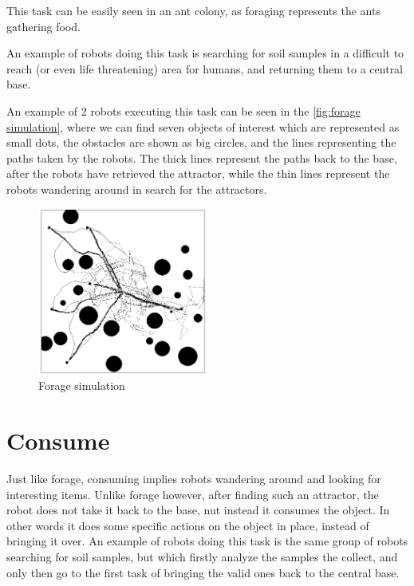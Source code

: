 \documentclass[12pt]{report}
\begin{document}
This task can be easily seen in an ant colony, as foraging represents the ants gathering food.

An example of robots doing this task is searching for soil samples in a difficult to reach (or even life threatening) area for humans, and returning them to a  central base.

An example of 2 robots executing this task can be seen in the \autoref{fig:forage simulation}, where we can find seven objects of interest which are represented as small dots, the obstacles are shown as big circles, and the lines representing the paths taken by the robots. The thick lines represent the paths back to the base, after the robots have retrieved the attractor, while the thin lines represent the robots wandering around in search for the attractors.

\begin{figure}[h]
\centering
\includegraphics[width=0.5\textwidth]{"1 forage simulation"}
\caption{Forage simulation}
\label{fig:forage simulation}
\end{figure}







\section{Consume}

Just like forage, consuming implies robots wandering around and looking for interesting items. Unlike forage however, after finding such an attractor, the robot does not take it back to the base, nut instead it consumes the object. In other words it does some specific actions on the object in place, instead of bringing it over. An example of robots doing this  task is the same group of robots searching for soil samples, but which firstly analyze the samples the collect,
and only then go to the first task of bringing the valid ones back to the central base.
\end{document}
